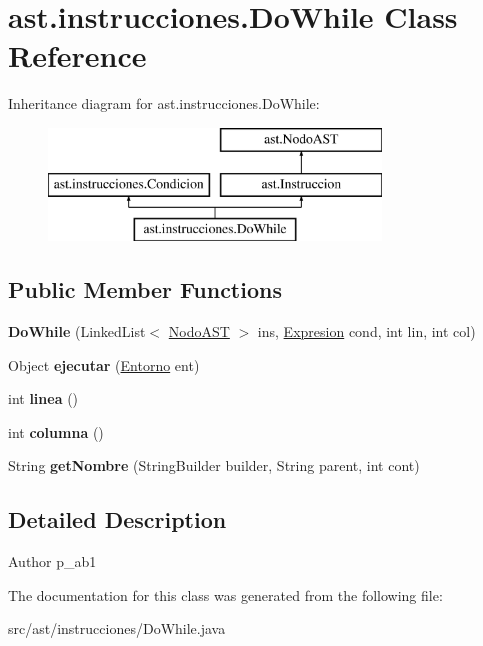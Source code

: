 \hypertarget{classast_1_1instrucciones_1_1_do_while}{}\section{ast.\+instrucciones.\+Do\+While Class Reference}
\label{classast_1_1instrucciones_1_1_do_while}
Inheritance diagram for ast.\+instrucciones.\+Do\+While\+:\begin{figure}[H]
\begin{center}
\leavevmode
\includegraphics[height=3.000000cm]{classast_1_1instrucciones_1_1_do_while}
\end{center}
\end{figure}
\subsection*{Public Member Functions}
\begin{DoxyCompactItemize}
\item 
\mbox{\label{classast_1_1instrucciones_1_1_do_while_a0f10c5f88ef45feb5e1aa0d5e1cc247e}} 
{\bfseries Do\+While} (Linked\+List$<$ \mbox{\hyperlink{interfaceast_1_1_nodo_a_s_t}{Nodo\+A\+ST}} $>$ ins, \mbox{\hyperlink{interfaceast_1_1_expresion}{Expresion}} cond, int lin, int col)
\item 
\mbox{\label{classast_1_1instrucciones_1_1_do_while_a8bf678c02671621f7f29f75d8f8a78ae}} 
Object {\bfseries ejecutar} (\mbox{\hyperlink{classentorno_1_1_entorno}{Entorno}} ent)
\item 
\mbox{\label{classast_1_1instrucciones_1_1_do_while_a9cd464bcac563581af14d5aea3fd5e89}} 
int {\bfseries linea} ()
\item 
\mbox{\label{classast_1_1instrucciones_1_1_do_while_aec03ae07f47565f34a68f68679c217b3}} 
int {\bfseries columna} ()
\item 
\mbox{\label{classast_1_1instrucciones_1_1_do_while_abc8cdc79a0a9a46b794c1001d9cb5cba}} 
String {\bfseries get\+Nombre} (String\+Builder builder, String parent, int cont)
\end{DoxyCompactItemize}


\subsection{Detailed Description}
\begin{DoxyAuthor}{Author}
p\+\_\+ab1 
\end{DoxyAuthor}


The documentation for this class was generated from the following file\+:\begin{DoxyCompactItemize}
\item 
src/ast/instrucciones/Do\+While.\+java\end{DoxyCompactItemize}
